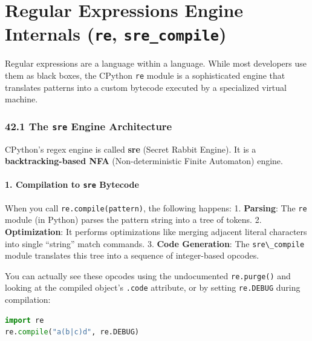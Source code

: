\hypertarget{regular-expressions-engine-internals-re-sre_compile}{%
\chapter{\texorpdfstring{Regular Expressions Engine Internals
(\texttt{re},
\texttt{sre\_compile})}{Regular Expressions Engine Internals (re, sre\_compile)}}\label{regular-expressions-engine-internals-re-sre_compile}}

Regular expressions are a language within a language. While most
developers use them as black boxes, the CPython
\passthrough{\lstinline!re!} module is a sophisticated engine that
translates patterns into a custom bytecode executed by a specialized
virtual machine.

\hypertarget{the-sre-engine-architecture}{%
\subsection{\texorpdfstring{42.1 The \texttt{sre} Engine
Architecture}{42.1 The sre Engine Architecture}}\label{the-sre-engine-architecture}}

CPython's regex engine is called \textbf{sre} (Secret Rabbit Engine). It
is a \textbf{backtracking-based NFA} (Non-deterministic Finite
Automaton) engine.

\hypertarget{compilation-to-sre-bytecode}{%
\subsubsection{\texorpdfstring{1. Compilation to \texttt{sre}
Bytecode}{1. Compilation to sre Bytecode}}\label{compilation-to-sre-bytecode}}

When you call \passthrough{\lstinline!re.compile(pattern)!}, the
following happens: 1. \textbf{Parsing}: The \passthrough{\lstinline!re!}
module (in Python) parses the pattern string into a tree of tokens. 2.
\textbf{Optimization}: It performs optimizations like merging adjacent
literal characters into single ``string'' match commands. 3.
\textbf{Code Generation}: The \passthrough{\lstinline!sre\_compile!}
module translates this tree into a sequence of integer-based opcodes.

You can actually see these opcodes using the undocumented
\passthrough{\lstinline!re.purge()!} and looking at the compiled
object's \passthrough{\lstinline!.code!} attribute, or by setting
\passthrough{\lstinline!re.DEBUG!} during compilation:

\begin{lstlisting}[language=Python]
import re
re.compile("a(b|c)d", re.DEBUG)
\end{lstlisting}

